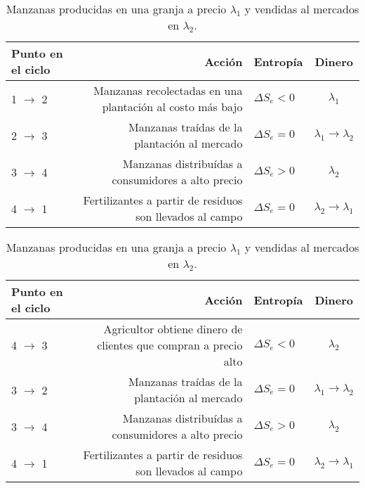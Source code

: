 \begin{table}	
\hskip-4.0cm\begin{tabular}{ |l |r | l | c| }
		\hline
		Punto en el ciclo &  Acción & Entropía & Dinero  \\ \hline
		1 $\rightarrow$ 2 & Manzanas recolectadas en una plantación al costo más bajo & $\Delta S_{e} < 0 $ &  $\lambda_{1}$ \\ \hline
		2 $\rightarrow$ 3 & Manzanas traídas de la plantación al mercado  & $\Delta S_{e} = 0 $ & $\lambda_{1} \rightarrow \lambda_{2}$\\ \hline
		3 $\rightarrow$ 4 &  Manzanas distribuídas a consumidores a alto precio   &$\Delta S_{e} > 0 $ & $\lambda_{2}$ \\  \hline
		4 $\rightarrow$ 1 & Fertilizantes a partir de residuos son llevados al campo &  $\Delta S_{e} = 0 $  &  $\lambda_{2} \rightarrow \lambda_{1}$\\  

		\hline
	\end{tabular}
	\label{tab:tab_manzanas}
	\caption{Manzanas producidas en una granja a precio $\lambda_{1}$ y vendidas al mercados en $\lambda_{2}$. }
\end{table}


\begin{table}	
	\hskip-4.0cm\begin{tabular}{ |l |r | l | c| }
		\hline
		Punto en el ciclo &  Acción & Entropía & Dinero  \\ \hline
		4 $\rightarrow$ 3 & Agricultor obtiene dinero de clientes que compran a precio alto & $\Delta S_{e} < 0 $ &  $\lambda_{2}$ \\ \hline
		3 $\rightarrow$ 2 & Manzanas traídas de la plantación al mercado  & $\Delta S_{e} = 0 $ & $\lambda_{1} \rightarrow \lambda_{2}$\\ \hline
		3 $\rightarrow$ 4 &  Manzanas distribuídas a consumidores a alto precio   &$\Delta S_{e} > 0 $ & $\lambda_{2}$ \\  \hline
		4 $\rightarrow$ 1 & Fertilizantes a partir de residuos son llevados al campo &  $\Delta S_{e} = 0 $  &  $\lambda_{2} \rightarrow \lambda_{1}$\\  
		
		\hline
	\end{tabular}
	\label{tab:tab_dineroManzana}
	\caption{Manzanas producidas en una granja a precio $\lambda_{1}$ y vendidas al mercados en $\lambda_{2}$. }
\end{table}